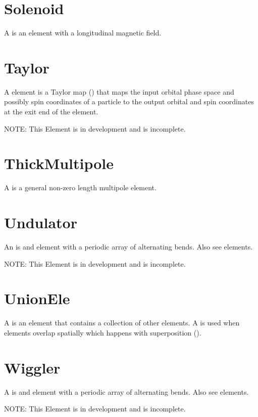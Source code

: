 \section{Solenoid}
\label{s:solenoid}

A  is an element with a longitudinal magnetic field.

\section{Taylor}
\label{s:taylor}

A  element is a Taylor map () that maps the input orbital phase space and
possibly spin coordinates of a particle to the output orbital and
spin coordinates at the exit end of the element.

NOTE: This Element is in development and is incomplete.

\section{ThickMultipole}
\label{s:thickmult}

A  is a general non-zero length multipole element.

\section{Undulator}
\label{s:undulator}

An  is and element with a periodic array of alternating bends.
Also see  elements.

NOTE: This Element is in development and is incomplete.

\section{UnionEle}
\label{s:unionele}

A  is an element that contains a collection of other elements.
A  is used when elements overlap spatially which happens with superposition ().

\section{Wiggler}
\label{s:wiggler}

A  is and element with a periodic array of alternating bends.
Also see  elements.

NOTE: This Element is in development and is incomplete.
